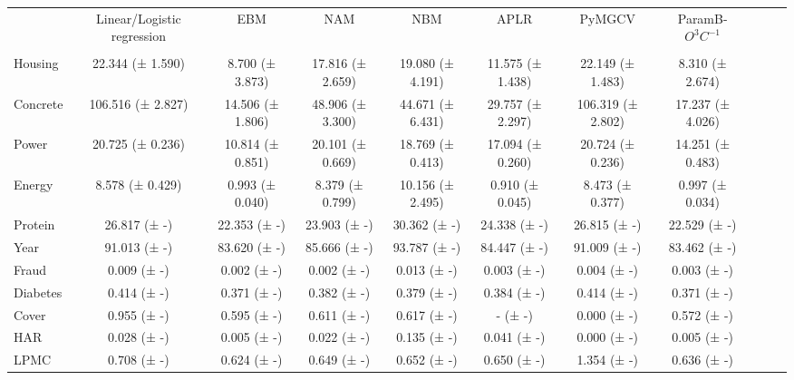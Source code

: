 \begin{tabular}{lcccccccccc}
\toprule
 & Linear/Logistic regression & EBM & NAM & NBM & APLR & PyMGCV & ParamB-$O^3C^{-1}$ \\
 &  &  &  &  &  &  &  \\
\midrule
Housing & 22.344 (± 1.590) & 8.700 (± 3.873) & 17.816 (± 2.659) & 19.080 (± 4.191) & 11.575 (± 1.438) & 22.149 (± 1.483) & 8.310 (± 2.674) \\
Concrete & 106.516 (± 2.827) & 14.506 (± 1.806) & 48.906 (± 3.300) & 44.671 (± 6.431) & 29.757 (± 2.297) & 106.319 (± 2.802) & 17.237 (± 4.026) \\
Power & 20.725 (± 0.236) & 10.814 (± 0.851) & 20.101 (± 0.669) & 18.769 (± 0.413) & 17.094 (± 0.260) & 20.724 (± 0.236) & 14.251 (± 0.483) \\
Energy & 8.578 (± 0.429) & 0.993 (± 0.040) & 8.379 (± 0.799) & 10.156 (± 2.495) & 0.910 (± 0.045) & 8.473 (± 0.377) & 0.997 (± 0.034) \\
Protein & 26.817 (± -) & 22.353 (± -) & 23.903 (± -) & 30.362 (± -) & 24.338 (± -) & 26.815 (± -) & 22.529 (± -) \\
Year & 91.013 (± -) & 83.620 (± -) & 85.666 (± -) & 93.787 (± -) & 84.447 (± -) & 91.009 (± -) & 83.462 (± -) \\
Fraud & 0.009 (± -) & 0.002 (± -) & 0.002 (± -) & 0.013 (± -) & 0.003 (± -) & 0.004 (± -) & 0.003 (± -) \\
Diabetes & 0.414 (± -) & 0.371 (± -) & 0.382 (± -) & 0.379 (± -) & 0.384 (± -) & 0.414 (± -) & 0.371 (± -) \\
Cover & 0.955 (± -) & 0.595 (± -) & 0.611 (± -) & 0.617 (± -) & - (± -) & 0.000 (± -) & 0.572 (± -) \\
HAR & 0.028 (± -) & 0.005 (± -) & 0.022 (± -) & 0.135 (± -) & 0.041 (± -) & 0.000 (± -) & 0.005 (± -) \\
LPMC & 0.708 (± -) & 0.624 (± -) & 0.649 (± -) & 0.652 (± -) & 0.650 (± -) & 1.354 (± -) & 0.636 (± -) \\
\bottomrule
\end{tabular}
